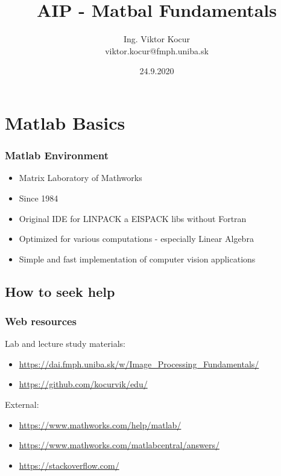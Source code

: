 \documentclass{beamer}
\title[1st lab]{AIP - Matbal Fundamentals}
\author[Kocur]{Ing. Viktor Kocur \\{\small viktor.kocur@fmph.uniba.sk}}
\institute{DAI FMFI UK}
\date{24.9.2020}
\begin{document}


\begin{frame}

  \titlepage

\end{frame}

\section{Matlab Basics}
\begin{frame}
\frametitle{Matlab Environment}

\begin{itemize}
\item Matrix Laboratory of Mathworks
\item Since 1984
\item Original IDE for LINPACK a EISPACK libs without Fortran 
\item Optimized for various computations - especially Linear Algebra
\item Simple and fast implementation of computer vision applications
\end{itemize}
\end{frame}

\subsection{How to seek help}

\begin{frame}
\frametitle{Web resources}

Lab and lecture study materials:
\begin{itemize}
\item \url{https://dai.fmph.uniba.sk/w/Image_Processing_Fundamentals/}
\item \url{https://github.com/kocurvik/edu/}
\end{itemize}


External:
\begin{itemize}
\item \url{https://www.mathworks.com/help/matlab/}
\item \url{https://www.mathworks.com/matlabcentral/answers/}
\item \url{https://stackoverflow.com/}
\end{itemize}
\end{frame}
\end{document}
